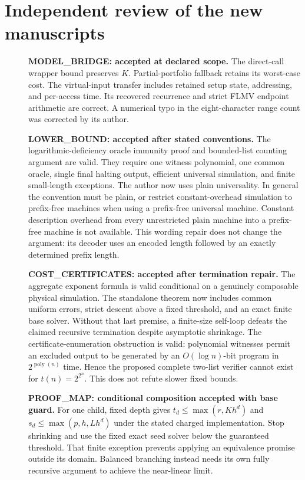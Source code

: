 \documentclass[11pt]{article}
\begin{document}
\section*{Independent review of the new manuscripts}
\begin{description}
\item[] \textbf{MODEL\_BRIDGE: accepted at declared scope.} The direct-call
wrapper bound preserves $K$. Partial-portfolio fallback retains its worst-case
cost. The virtual-input transfer includes retained setup state, addressing,
and per-access time. Its recovered recurrence and strict FLMV endpoint
arithmetic are correct. A numerical typo in the eight-character range count
was corrected by its author.
\item[] \textbf{LOWER\_BOUND: accepted after stated conventions.} The
logarithmic-deficiency oracle immunity proof and bounded-list counting
argument are valid. They require one witness polynomial, one common oracle,
single final halting output, efficient universal simulation, and finite
small-length exceptions. The author now uses plain universality. In general the convention must be plain, or
restrict constant-overhead simulation to prefix-free machines when using a
prefix-free universal machine. Constant description overhead from every
unrestricted plain machine into a prefix-free machine is not available.
This wording repair does not change the argument: its decoder uses an
encoded length followed by an exactly determined prefix length.
\item[] \textbf{COST\_CERTIFICATES: accepted after termination repair.}
The aggregate exponent formula is valid conditional on a genuinely composable
physical simulation. The standalone theorem now includes common uniform
errors, strict descent above a fixed threshold, and an exact finite base
solver. Without that last premise, a finite-size self-loop defeats the
claimed recursive termination despite asymptotic shrinkage.
The certificate-enumeration obstruction is valid: polynomial witnesses permit
an excluded output to be generated by an $O(\log n)$-bit program in
$2^{\operatorname{poly}(n)}$ time. Hence the proposed complete two-list verifier
cannot exist for $t(n)=2^{2^n}$. This does not refute slower fixed bounds.
\item[] \textbf{PROOF\_MAP: conditional composition accepted with base guard.}
For one child, fixed depth gives $t_d\le\max(r,Kh^d)$ and
$s_d\le\max(p,h,Lh^d)$ under the stated charged implementation.
Stop shrinking and use the fixed exact seed solver below the guaranteed
threshold. That finite exception prevents applying an equivalence promise
outside its domain. Balanced branching instead needs its own fully
recursive argument to achieve the near-linear limit.
\end{description}
\end{document}
